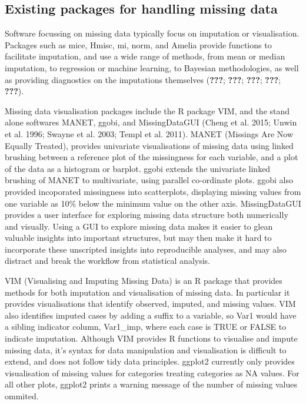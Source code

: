 \documentclass[]{article}
\begin{document}
\subsection{Existing packages for handling missing
data}\label{existing-packages-for-handling-missing-data}

Software focussing on missing data typically focus on imputation or
visualisation. Packages such as mice, Hmisc, mi, norm, and Amelia
provide functions to facilitate imputation, and use a wide range of
methods, from mean or median imputation, to regression or machine
learning, to Bayesian methodologies, as well as providing diagnostics on
the imputations themselves ({\textbf{???}}; {\textbf{???}};
{\textbf{???}}; {\textbf{???}}; {\textbf{???}}).

Missing data visualisation packages include the R package VIM, and the
stand alone softwares MANET, ggobi, and MissingDataGUI (Cheng et al.
2015; Unwin et al. 1996; Swayne et al. 2003; Templ et al. 2011). MANET
(Missings Are Now Equally Treated), provides univariate visualisations
of missing data using linked brushing between a reference plot of the
missingness for each variable, and a plot of the data as a histogram or
barplot. ggobi extends the univariate linked brushing of MANET to
multivariate, using parallel co-ordinate plots. ggobi also provided
incoporated missingness into scatterplots, displaying missing values
from one variable as 10\% below the minimum value on the other axis.
MissingDataGUI provides a user interface for exploring missing data
structure both numerically and visually. Using a GUI to explore missing
data makes it easier to glean valuable insights into important
structures, but may then make it hard to incorporate these unscripted
insights into reproducible analyses, and may also distract and break the
workflow from statistical analysis.

VIM (Visualising and Imputing Missing Data) is an R package that
provides methods for both imputation and visualisation of missing data.
In particular it provides visualisations that identify observed,
imputed, and missing values. VIM also identifies imputed cases by adding
a suffix to a variable, so Var1 would have a sibling indicator column,
Var1\_imp, where each case is TRUE or FALSE to indicate imputation.
Although VIM provides R functions to visualise and impute missing data,
it's syntax for data manipulation and visualisation is difficult to
extend, and does not follow tidy data principles. ggplot2 currently only
provides visualisation of missing values for categories treating
categories as NA values. For all other plots, ggplot2 prints a warning
message of the number of missing values ommited.
\end{document}

